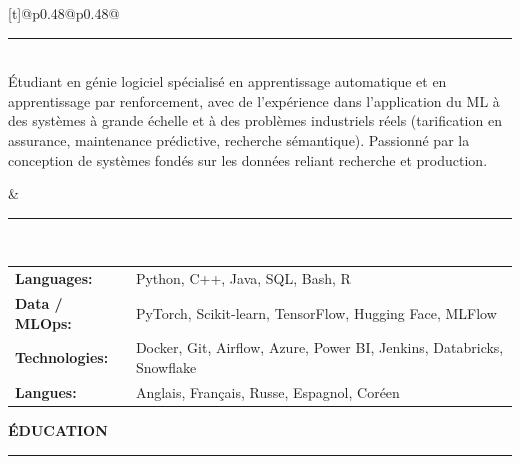 \documentclass[a4paper,10pt]{article}
\begin{document}
    \noindent
    \begin{tabularx}{\textwidth}[t]{@{}p{0.48\textwidth}@{\hspace{2em}}p{0.48\textwidth}@{}}
      \parbox[t]{\linewidth}{
        \hspace{6em}\rule{\dimexpr\linewidth-6.2em}{0.4pt} \\[0.5em]
            Étudiant en génie logiciel spécialisé en apprentissage automatique et en apprentissage par renforcement, avec de l’expérience dans l’application du ML à des systèmes à grande échelle et à des problèmes industriels réels (tarification en assurance, maintenance prédictive, recherche sémantique). Passionné par la conception de systèmes fondés sur les données reliant recherche et production.
      }
      &
      \parbox[t]{\linewidth}{
        \hspace{9em}\rule{\dimexpr\linewidth-9.5em}{0.5pt} \\[1em]
        \begin{tabular}{@{}p{2.5cm}p{\dimexpr\linewidth-3.2cm}@{}}
          \textbf{Languages:} & Python, C++, Java, SQL, Bash, R \\[0.2em]
          \textbf{Data / MLOps:} & PyTorch, Scikit-learn, TensorFlow, Hugging Face, MLFlow \\[0.2em]
          \textbf{Technologies:} & Docker, Git, Airflow, Azure, Power BI, Jenkins, Databricks, Snowflake
          \\[0.2em]
          \textbf{Langues:} & Anglais, Français, Russe, Espagnol, Coréen
        \end{tabular}
      }
    \end{tabularx}
    
    \vspace{0.2em}
    \textbf{\large ÉDUCATION} \hspace{0.2em}\rule{\dimexpr\linewidth-8em}{0.4pt} \\[0em]
    
\end{document}
